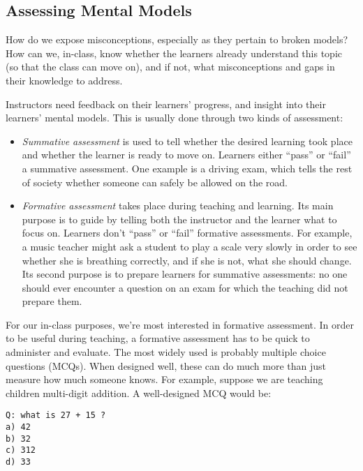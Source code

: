 \subsection{Assessing Mental Models}\label{assessing-mental-models}

How do we expose misconceptions, especially as they pertain to broken
models? How can we, in-class, know whether the learners already
understand this topic (so that the class can move on), and if not, what
misconceptions and gaps in their knowledge to address.

Instructors need feedback on their learners' progress, and insight into
their learners' mental models. This is usually done through two kinds of
assessment:

\begin{itemize}
\itemsep1pt\parskip0pt
\item
  \emph{Summative assessment} is used to tell whether the desired
  learning took place and whether the learner is ready to move on.
  Learners either ``pass'' or ``fail'' a summative assessment. One
  example is a driving exam, which tells the rest of society whether
  someone can safely be allowed on the road.
\item
  \emph{Formative assessment} takes place during teaching and learning.
  Its main purpose is to guide by telling both the instructor and the
  learner what to focus on. Learners don't ``pass'' or ``fail''
  formative assessments. For example, a music teacher might ask a
  student to play a scale very slowly in order to see whether she is
  breathing correctly, and if she is not, what she should change. Its
  second purpose is to prepare learners for summative assessments: no
  one should ever encounter a question on an exam for which the teaching
  did not prepare them.
\end{itemize}

For our in-class purposes, we're most interested in formative
assessment. In order to be useful during teaching, a formative
assessment has to be quick to administer and evaluate. The most widely
used is probably multiple choice questions (MCQs). When designed well,
these can do much more than just measure how much someone knows. For
example, suppose we are teaching children multi-digit addition. A
well-designed MCQ would be:

\begin{verbatim}
Q: what is 27 + 15 ?
a) 42
b) 32
c) 312
d) 33
\end{verbatim}

